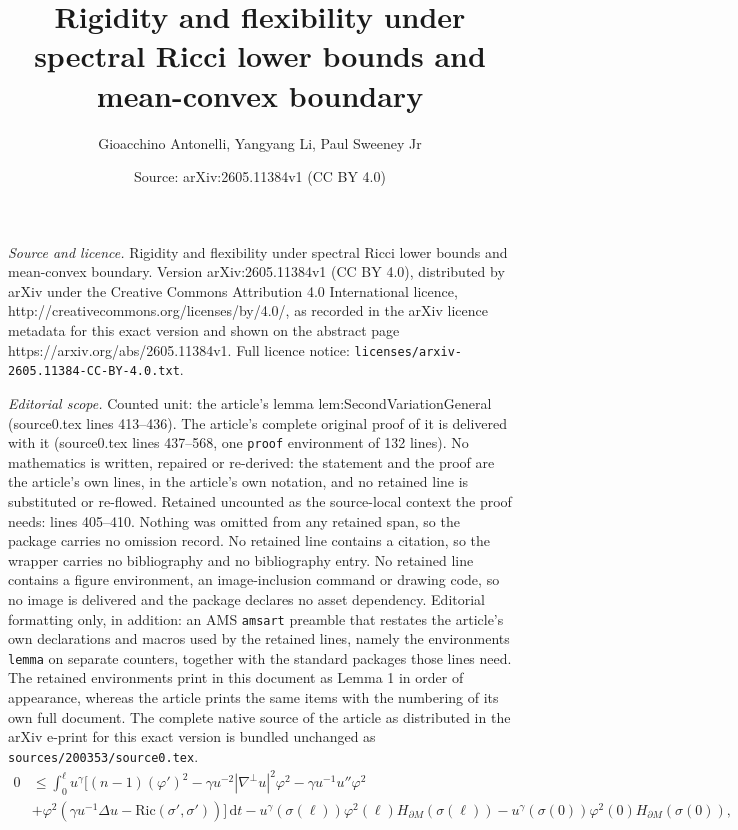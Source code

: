 \documentclass[10pt,a4paper]{amsart}
\title{Rigidity and flexibility under spectral Ricci lower bounds and mean-convex boundary}
\author{Gioacchino Antonelli, Yangyang Li, Paul Sweeney Jr}
\date{Source: arXiv:2605.11384v1 (CC BY 4.0)}
\newcommand{\D}{\nabla}
\renewcommand{\leq}{\leqslant}
\begin{document}
\maketitle

\noindent\emph{Source and licence.} Rigidity and flexibility under spectral Ricci lower bounds and mean-convex boundary. Version arXiv:2605.11384v1 (CC BY 4.0), distributed by arXiv under the Creative Commons Attribution 4.0 International licence, http://creativecommons.org/licenses/by/4.0/, as recorded in the arXiv licence metadata for this exact version and shown on the abstract page https://arxiv.org/abs/2605.11384v1. Full licence notice: \texttt{licenses/arxiv-2605.11384-CC-BY-4.0.txt}.\par\smallskip

\noindent\textit{Editorial scope.} Counted unit: the article's lemma lem:SecondVariationGeneral (source0.tex lines 413--436). The article's complete original proof of it is delivered with it (source0.tex lines 437--568, one \texttt{proof} environment of 132 lines). No mathematics is written, repaired or re-derived: the statement and the proof are the article's own lines, in the article's own notation, and no retained line is substituted or re-flowed.  Retained uncounted as the source-local context the proof needs: lines 405--410.  Nothing was omitted from any retained span, so the package carries no omission record.  No retained line contains a citation, so the wrapper carries no bibliography and no bibliography entry.  No retained line contains a figure environment, an image-inclusion command or drawing code, so no image is delivered and the package declares no asset dependency.  Editorial formatting only, in addition: an AMS \texttt{amsart} preamble that restates the article's own declarations and macros used by the retained lines, namely the environments \texttt{lemma} on separate counters, together with the standard packages those lines need.  The retained environments print in this document as Lemma 1 in order of appearance, whereas the article prints the same items with the numbering of its own full document.  The complete native source of the article as distributed in the arXiv e-print for this exact version is bundled unchanged as \texttt{sources/200353/source0.tex}.
\begin{equation}\label{eqn:second varitationsummed}
    \begin{aligned}
    0 &\leq \int_0^\ell u^\gamma\Big[(n-1)(\varphi')^2-\gamma u^{-2}|\D^\perp u|^2\varphi^2-\gamma u^{-1}u''\varphi^2 \\
    & +\varphi^2(\gamma u^{-1}\Delta u - \mathrm{Ric}(\sigma',\sigma'))\Big]\,\mathrm{d}t - u^\gamma(\sigma(\ell)) \varphi^2(\ell)H_{\partial M}(\sigma(\ell))-u^\gamma(\sigma(0)) \varphi^2(0)H_{\partial M}(\sigma(0)),
\end{aligned}
\end{equation}
\end{document}
